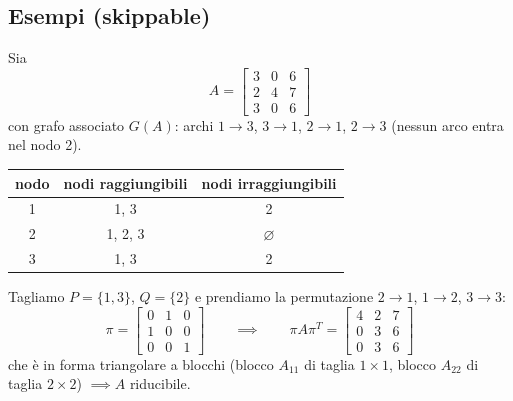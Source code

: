 \documentclass[12pt,a4paper,]{report}
\begin{document}
\subsection{Esempi (skippable)}

Sia
\[
A = \begin{bmatrix} 3 & 0 & 6 \\ 2 & 4 & 7 \\ 3 & 0 & 6\end{bmatrix}
\]
con grafo associato $G(A)$: archi $1\to3$, $3\to1$, $2\to1$, $2\to3$ (nessun arco entra nel nodo 2).

\begin{center}
\begin{tabular}{c|c|c}
    nodo & nodi raggiungibili & nodi irraggiungibili \\
    \hline
    1 & 1, 3 & 2 \\
    2 & 1, 2, 3 & $\varnothing$ \\
    3 & 1, 3 & 2
\end{tabular}
\end{center}

Tagliamo $P=\{1,3\}$, $Q=\{2\}$ e prendiamo la permutazione $2\to1$, $1\to2$, $3\to3$:
\[
\pi = \begin{bmatrix} 0&1&0 \\ 1&0&0 \\ 0&0&1\end{bmatrix}
\qquad\implies\qquad
\pi A \pi^T =
\begin{bmatrix}
4 & 2 & 7 \\
0 & 3 & 6 \\
0 & 3 & 6
\end{bmatrix}
\]
che è in forma triangolare a blocchi (blocco $A_{11}$ di taglia $1\times1$, blocco $A_{22}$ di taglia $2\times2$) $\implies A$ riducibile.
\end{document}
